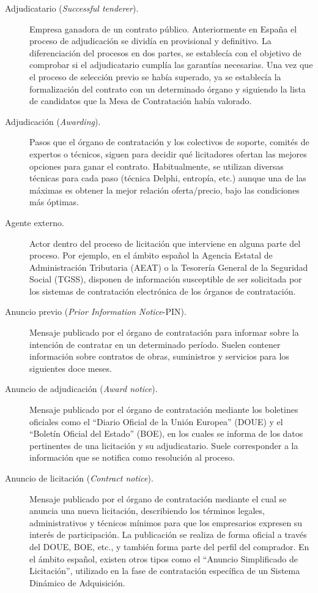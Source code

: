 \begin{description}

\item [Adjudicatario (\textit{Successful tenderer}).] Empresa ganadora de un contrato público. Anteriormente en España
el proceso de adjudicación se dividía en provisional y definitivo. La diferenciación del procesos en dos partes, se 
establecía con el objetivo de comprobar si el adjudicatario cumplía las garantías necesarias.
Una vez que el proceso de selección previo se había superado, ya se establecía la formalización
del contrato con un determinado órgano y siguiendo la lista de candidatos que la Mesa de Contratación había valorado.

\item [Adjudicación (\textit{Awarding}).] Pasos que el órgano de contratación y los colectivos de soporte, 
comités de expertos o técnicos, siguen para decidir qué licitadores ofertan las mejores
opciones para ganar el contrato. Habitualmente, se utilizan diversas técnicas para
cada paso (técnica Delphi, entropía, etc.) aunque una de las máximas es obtener
la mejor relación oferta/precio, bajo las condiciones más óptimas.

\item [Agente externo.] Actor dentro del proceso de licitación que interviene en alguna
parte del proceso. Por ejemplo, en el ámbito español la Agencia Estatal de Administración Tributaria (\gls{AEAT}) o la
Tesorería General de la Seguridad Social (\gls{TGSS}), disponen de información susceptible de ser solicitada
por los sistemas de contratación electrónica de los órganos de contratación.

\item [Anuncio previo (\textit{Prior Information Notice}-\gls{PIN}).] Mensaje publicado por el órgano de contratación para informar sobre
la intención de contratar en un determinado período. Suelen contener información sobre
contratos de obras, suministros y servicios para los siguientes doce meses.

\item [Anuncio de adjudicación (\textit{Award notice}).] Mensaje publicado por el órgano de contratación mediante
los boletines oficiales como el ``Diario Oficial de la Unión Europea'' (\gls{DOUE}) y el ``Boletín
Oficial del Estado'' (\gls{BOE}), en los cuales se informa de los datos pertinentes de una
licitación y su adjudicatario. Suele corresponder a la información que se notifica
como resolución al proceso.

\item [Anuncio de licitación (\textit{Contract notice}).] Mensaje publicado por el órgano de contratación mediante
el cual se anuncia una nueva licitación, describiendo los términos legales, administrativos y
técnicos mínimos para que los empresarios expresen su interés de participación. La publicación
se realiza de forma oficial a través del \gls{DOUE}, \gls{BOE}, etc., y también forma parte del perfil
del comprador. En el ámbito español, existen otros tipos como el ``Anuncio Simplificado de Licitación'', utilizado 
en la fase de contratación específica de un Sistema Dinámico de Adquisición.


\end{description}
